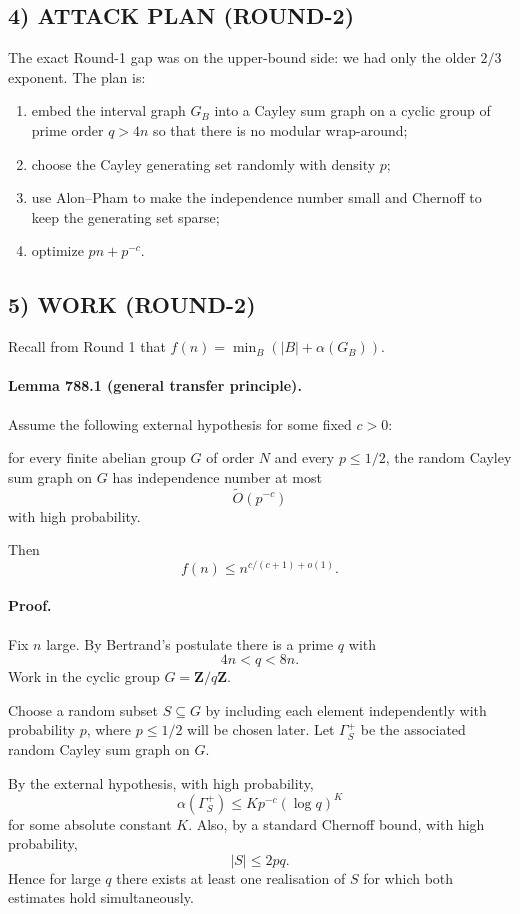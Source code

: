 \subsection*{4) ATTACK PLAN (ROUND-2)}
The exact Round-1 gap was on the upper-bound side: we had only the older $2/3$ exponent. The plan is:
\begin{enumerate}
\item embed the interval graph $G_B$ into a Cayley sum graph on a cyclic group of prime order $q>4n$ so that there is no modular wrap-around;
\item choose the Cayley generating set randomly with density $p$;
\item use Alon--Pham to make the independence number small and Chernoff to keep the generating set sparse;
\item optimize $pn + p^{-c}$.
\end{enumerate}

\subsection*{5) WORK (ROUND-2)}
Recall from Round 1 that $f(n)=\min_B (|B|+\alpha(G_B))$.

\paragraph{Lemma 788.1 (general transfer principle).}
Assume the following external hypothesis for some fixed $c>0$:

\medskip
\noindent
for every finite abelian group $G$ of order $N$ and every $p \le 1/2$, the random Cayley sum graph on $G$ has independence number at most
\[
 \widetilde O(p^{-c})
\]
with high probability.
\medskip

Then
\[
 f(n) \le n^{c/(c+1)+o(1)}.
\]

\paragraph{Proof.}
Fix $n$ large. By Bertrand's postulate there is a prime $q$ with
\[
 4n < q < 8n.
\]
Work in the cyclic group $G = \mathbf Z / q\mathbf Z$.

Choose a random subset $S \subseteq G$ by including each element independently with probability $p$, where $p \le 1/2$ will be chosen later. Let $\Gamma_S^+$ be the associated random Cayley sum graph on $G$.

By the external hypothesis, with high probability,
\[
 \alpha(\Gamma_S^+) \le K p^{-c} (\log q)^K
\]
for some absolute constant $K$.
Also, by a standard Chernoff bound, with high probability,
\[
 |S| \le 2pq.
\]
Hence for large $q$ there exists at least one realisation of $S$ for which both estimates hold simultaneously.

